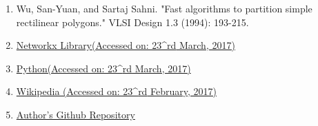 \documentclass[11pt, a4paper, oneside]{Thesis} %
\begin{document}
\begin{enumerate}
	\item Wu, San-Yuan, and Sartaj Sahni. "Fast algorithms to partition simple rectilinear polygons." VLSI Design 1.3 (1994): 193-215.
	\item  \href{http://networkx.github.io/}{Networkx Library(Accessed on: 23^{rd} March, 2017)}
	\item \href{http://www.python.org/ }{Python(Accessed on: 23^{rd} March, 2017)}
	\item \href{http://en.wikipedia.org/}{Wikipedia (Accessed on: 23^{rd} February, 2017)}
	\item \href{https://github.com/mittalgovind/Polygon-Partition}{Author's Github Repository}
\end{enumerate}
\end{document}

